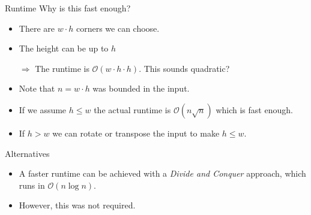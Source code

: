 \begin{slide}
	\begin{block}{Runtime}
		Why is this fast enough?
		\begin{itemize}
			\item There are $w\cdot{}h$ corners we can choose.
			\item The height can be up to $h$
			\item[$\Rightarrow$] The runtime is $\mathcal{O}(w\cdot h\cdot h)$. This sounds quadratic?
			\pause
			\item Note that $n=w\cdot{}h$ was bounded in the input.
			\item If we assume $h\leq w$ the actual runtime is $\mathcal{O}(n\sqrt{n})$ which is fast enough.
			\pause
			\item If $h>w$ we can rotate or transpose the input to make $h\leq w$.
		\end{itemize}
	\end{block}
	\pause
	\begin{block}{Alternatives}
		\begin{itemize}
			\item A faster runtime can be achieved with a \emph{Divide and Conquer} approach, which runs in $\mathcal{O}(n\log{n})$.
			\item However, this was not required.
		\end{itemize}
	\end{block}
\end{slide}
